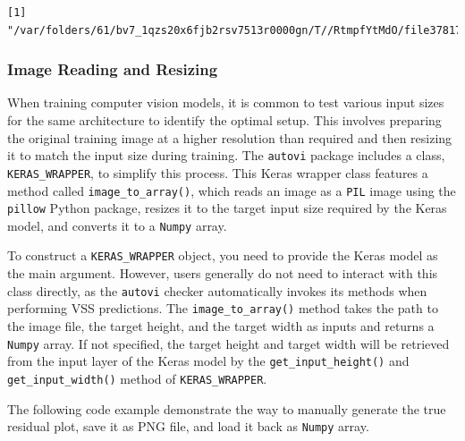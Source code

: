 \documentclass[
doublespace,
  times]{anzsauth}
\newenvironment{Shaded}{\begin{snugshade}}{\end{snugshade}}
\newcommand{\FunctionTok}[1]{\textcolor[rgb]{0.28,0.35,0.67}{#1}}
\newcommand{\NormalTok}[1]{\textcolor[rgb]{0.00,0.23,0.31}{#1}}
\newcommand{\SpecialCharTok}[1]{\textcolor[rgb]{0.37,0.37,0.37}{#1}}
\begin{document}
\begin{Shaded}
\end{Shaded}

\begin{verbatim}
[1] "/var/folders/61/bv7_1qzs20x6fjb2rsv7513r0000gn/T//RtmpfYtMdO/file37817b7b5b6.png"
\end{verbatim}

\subsubsection{Image Reading and
Resizing}\label{image-reading-and-resizing}

When training computer vision models, it is common to test various input
sizes for the same architecture to identify the optimal setup. This
involves preparing the original training image at a higher resolution
than required and then resizing it to match the input size during
training. The \texttt{autovi} package includes a class,
\texttt{KERAS\_WRAPPER}, to simplify this process. This Keras wrapper
class features a method called \texttt{image\_to\_array()}, which reads
an image as a \texttt{PIL} image using the \texttt{pillow} Python
package, resizes it to the target input size required by the Keras
model, and converts it to a \texttt{Numpy} array.

To construct a \texttt{KERAS\_WRAPPER} object, you need to provide the
Keras model as the main argument. However, users generally do not need
to interact with this class directly, as the \texttt{autovi} checker
automatically invokes its methods when performing VSS predictions. The
\texttt{image\_to\_array()} method takes the path to the image file, the
target height, and the target width as inputs and returns a
\texttt{Numpy} array. If not specified, the target height and target
width will be retrieved from the input layer of the Keras model by the
\texttt{get\_input\_height()} and \texttt{get\_input\_width()} method of
\texttt{KERAS\_WRAPPER}.

The following code example demonstrate the way to manually generate the
true residual plot, save it as PNG file, and load it back as
\texttt{Numpy} array.
\end{document}
